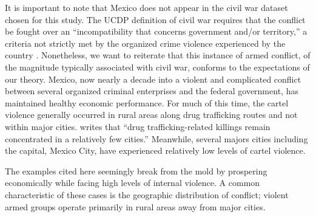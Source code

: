 It is important to note that Mexico does not appear in the civil war dataset chosen for this study. The UCDP definition of civil war requires that the conflict be fought over an ``incompatibility that concerns government and/or territory,'' a criteria not strictly met by the organized crime violence experienced by the country \citep[p.1]{themner:2014}. Nonetheless, we want to reiterate that this instance of armed conflict, of the magnitude typically associated with civil war, conforms to the expectations of our theory. Mexico, now nearly a decade into a violent and complicated conflict between several organized criminal enterprises and the federal government, has maintained healthy economic performance. For much of this time, the cartel violence generally occurred in rural areas along drug trafficking routes and not within major cities. \citet{beittel:2011} writes that ``drug trafficking-related killings remain concentrated in a relatively few cities.'' Meanwhile, several majors cities including the capital, Mexico City, have experienced relatively low levels of cartel violence.

The examples cited here seemingly break from the mold by prospering economically while facing high levels of internal violence. A common characteristic of these cases is the geographic distribution of conflict; violent armed groups operate primarily in rural areas away from major cities.
